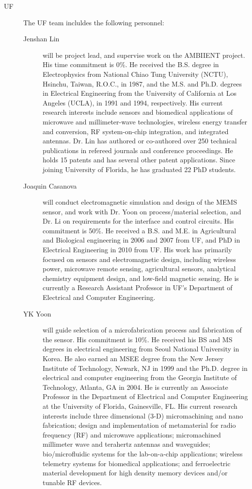 \begin{description}
\item[UF] The UF team incluldes the following personnel:
  \begin{description}
  \item[Jenshan Lin] will be project lead, and supervise work on the AMBIIENT project. His time commitment is 0\%. He received the B.S. degree in Electrophysics from National Chiao Tung University (NCTU), Hsinchu, Taiwan, R.O.C., in 1987, and the M.S. and Ph.D. degrees in Electrical Engineering from the University of California at Los Angeles (UCLA), in 1991 and 1994, respectively. His current research interests include sensors and biomedical applications of microwave and millimeter-wave technologies, wireless energy transfer and conversion, RF system-on-chip integration, and integrated antennas. Dr. Lin has authored or co-authored over 250 technical publications in refereed journals and conference proceedings. He holds 15 patents and has several other patent applications. Since joining University of Florida, he has graduated 22 PhD students. 
  \item[Joaquin Casanova] will conduct electromagnetic simulation and design of the MEMS sensor, and work with Dr. Yoon on process/material selection, and Dr. Li on requirements for the interface and control circuits. His commitment is 50\%. He received a B.S. and M.E. in Agricultural and Biological engineering in 2006 and 2007 from UF, and PhD in Electrical Engineering in 2010 from UF. His work has primarily focused on sensors and electromagnetic design, including wireless power, microwave remote sensing, agricultural sensors, analytical chemistry equipment design, and low-field magnetic sensing. He is currently a Research Assistant Professor in UF's Department of Electrical and Computer Engineering. 
  \item[YK Yoon] will guide selection of a microfabrication process and fabrication of the sensor. His commitment is 10\%. He received his BS and MS degrees in electrical engineering from Seoul National University in Korea. He also earned an MSEE degree from the New Jersey Institute of Technology, Newark, NJ in 1999 and the Ph.D. degree in electrical and computer engineering from the Georgia Institute of Technology, Atlanta, GA in 2004. He is currently an Associate Professor in the Department of Electrical and Computer Engineering at the University of Florida, Gainesville, FL. His current research interests include three dimensional (3-D) micromachining and nano fabrication; design and implementation of metamaterial for radio frequency (RF) and microwave applications; micromachined millimeter wave and terahertz antennas and waveguides; bio/microfluidic systems for the lab-on-a-chip applications; wireless telemetry systems for biomedical applications; and ferroelectric material development for high density memory devices and/or tunable RF devices.

\end{description}
\end{description}
